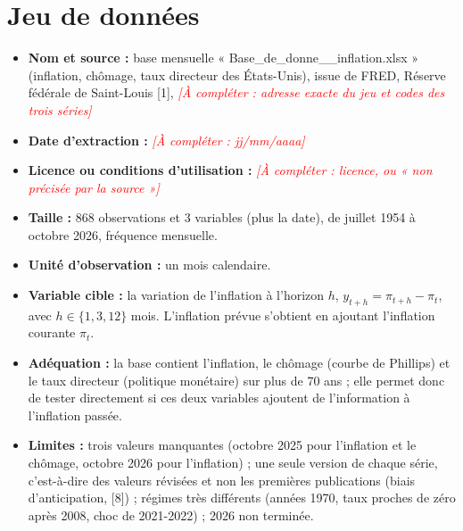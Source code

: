 \documentclass[11pt,a4paper]{article}
\newcommand{\todo}[1]{\textcolor{red}{\textit{[À compléter : #1]}}}
\begin{document}
\section{Jeu de données}
\begin{itemize}
\item \textbf{Nom et source :} base mensuelle « Base\_de\_donne\_\_inflation.xlsx » (inflation, chômage, taux directeur des États-Unis), issue de FRED, Réserve fédérale de Saint-Louis [1], \todo{adresse exacte du jeu et codes des trois séries}
\item \textbf{Date d'extraction :} \todo{jj/mm/aaaa}
\item \textbf{Licence ou conditions d'utilisation :} \todo{licence, ou « non précisée par la source »}
\item \textbf{Taille :} 868 observations et 3 variables (plus la date), de juillet 1954 à octobre 2026, fréquence mensuelle.
\item \textbf{Unité d'observation :} un mois calendaire.
\item \textbf{Variable cible :} la variation de l'inflation à l'horizon $h$, $y_{t+h}=\pi_{t+h}-\pi_t$, avec $h\in\{1,3,12\}$ mois. L'inflation prévue s'obtient en ajoutant l'inflation courante $\pi_t$.
\item \textbf{Adéquation :} la base contient l'inflation, le chômage (courbe de Phillips) et le taux directeur (politique monétaire) sur plus de 70 ans ; elle permet donc de tester directement si ces deux variables ajoutent de l'information à l'inflation passée.
\item \textbf{Limites :} trois valeurs manquantes (octobre 2025 pour l'inflation et le chômage, octobre 2026 pour l'inflation) ; une seule version de chaque série, c'est-à-dire des valeurs révisées et non les premières publications (biais d'anticipation, [8]) ; régimes très différents (années 1970, taux proches de zéro après 2008, choc de 2021-2022) ; 2026 non terminée.
\end{itemize}
\end{document}
